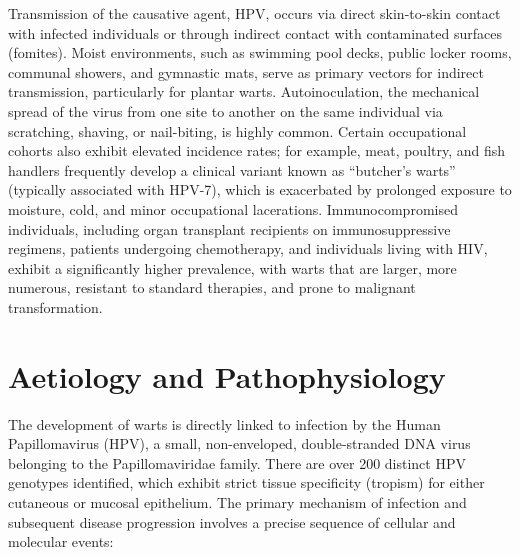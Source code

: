 Transmission of the causative agent, HPV, occurs via direct skin-to-skin contact with infected individuals or through indirect contact with contaminated surfaces (fomites). Moist environments, such as swimming pool decks, public locker rooms, communal showers, and gymnastic mats, serve as primary vectors for indirect transmission, particularly for plantar warts. Autoinoculation, the mechanical spread of the virus from one site to another on the same individual via scratching, shaving, or nail-biting, is highly common. Certain occupational cohorts also exhibit elevated incidence rates; for example, meat, poultry, and fish handlers frequently develop a clinical variant known as ``butcher's warts'' (typically associated with HPV-7), which is exacerbated by prolonged exposure to moisture, cold, and minor occupational lacerations. Immunocompromised individuals, including organ transplant recipients on immunosuppressive regimens, patients undergoing chemotherapy, and individuals living with HIV, exhibit a significantly higher prevalence, with warts that are larger, more numerous, resistant to standard therapies, and prone to malignant transformation.

\section*{Aetiology and Pathophysiology}
The development of warts is directly linked to infection by the Human Papillomavirus (HPV), a small, non-enveloped, double-stranded DNA virus belonging to the Papillomaviridae family. There are over 200 distinct HPV genotypes identified, which exhibit strict tissue specificity (tropism) for either cutaneous or mucosal epithelium. The primary mechanism of infection and subsequent disease progression involves a precise sequence of cellular and molecular events:

